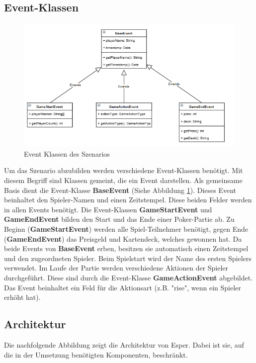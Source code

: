 \subsection{Event-Klassen}

\begin{figure}[ht]
	\centering
	\includegraphics[width=\textwidth,height=\textheight,keepaspectratio]{images/Events.png}
	\caption{Event Klassen des Szenarios}
	\label{EventKlassen}
\end{figure}

Um das Szenario abzubilden werden verschiedene Event-Klassen benötigt. Mit diesem Begriff sind Klassen gemeint, die ein Event darstellen.
Als gemeinsame Basis dient die Event-Klasse \textbf{BaseEvent} (Siehe Abbildung \ref{EventKlassen}). Dieses Event beinhaltet den Spieler-Namen und einen Zeitstempel. Diese beiden Felder werden in allen Events benötigt.
\absatz
Die Event-Klassen \textbf{GameStartEvent} und \textbf{GameEndEvent} bilden den Start und das Ende einer Poker-Partie ab. Zu Beginn (\textbf{GameStartEvent}) werden alle Spiel-Teilnehmer benötigt, gegen Ende (\textbf{GameEndEvent}) das Preisgeld und Kartendeck, welches gewonnen hat. Da beide Events von \textbf{BaseEvent} erben, besitzen sie automatisch einen Zeitstempel und den zugeordneten Spieler. Beim Spielstart wird der Name des ersten Spielers verwendet.
\absatz
Im Laufe der Partie werden verschiedene Aktionen der Spieler durchgeführt. Diese sind durch die Event-Klasse \textbf{GameActionEvent} abgebildet. Das Event beinhaltet ein Feld für die Aktionsart (z.B. "rise", wenn ein Spieler erhöht hat).

\subsection{Architektur}
\label{kapitel_architektur}
Die nachfolgende Abbildung zeigt die Architektur von Esper. Dabei ist sie, auf die in der Umsetzung benötigten Komponenten, beschränkt.

